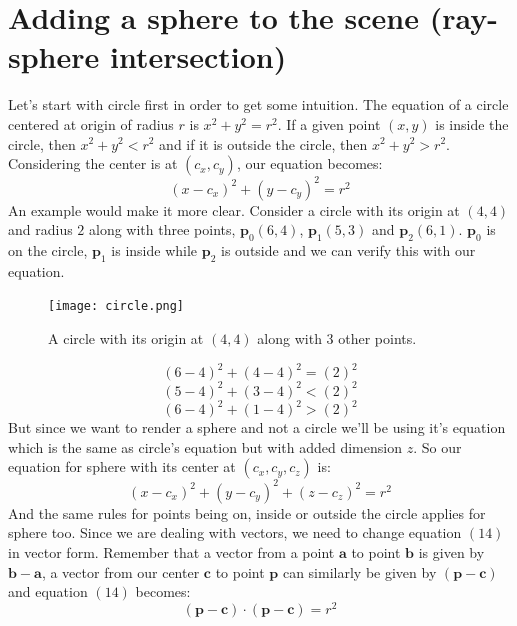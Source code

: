 \documentclass[11pt,a4paper]{article}
\begin{document}
	\section{Adding a sphere to the scene (ray-sphere intersection)}
	Let's start with circle first in order to get some intuition. The equation of a circle centered at origin of radius $r$ is $x^2+y^2=r^2$. If a given point $(x, y)$ is inside the circle, then $x^2+y^2<r^2$ and if it is outside the circle, then $x^2+y^2>r^2$. Considering the center is at $(c_{x}, c_{y})$, our equation becomes:
	\begin{equation}
		(x-c_{x})^2+(y-c_{y})^2=r^2
	\end{equation}
	An example would make it more clear. Consider a circle with its origin at $(4, 4)$ and radius $2$ along with three points, $\boldsymbol{p}_{0}(6, 4)$, $\boldsymbol{p}_{1}(5, 3)$ and $\boldsymbol{p}_{2}(6, 1)$. $\boldsymbol{p}_{0}$ is on the circle, $\boldsymbol{p}_{1}$ is inside while $\boldsymbol{p}_{2}$ is outside and we can verify this with our equation.
	\begin{figure}[H]
		\centering
		\texttt{[image: circle.png]}
		\caption{\centering A circle with its origin at $(4, 4)$ along with 3 other points.}
	\end{figure}
	\noindent
	\begin{equation}
		(6-4)^2+(4-4)^2=(2)^2
	\end{equation}
	\begin{equation}
		(5-4)^2+(3-4)^2<(2)^2
	\end{equation}
	\begin{equation}
		(6-4)^2+(1-4)^2>(2)^2
	\end{equation}
	But since we want to render a sphere and not a circle we'll be using it's equation which is the same as circle's equation but with added dimension $z$. So our equation for sphere with its center at $(c_{x}, c_{y}, c_{z})$ is:
	\begin{equation}
		(x-c_{x})^2+(y-c_{y})^2+(z-c_{z})^2=r^2
	\end{equation}
	And the same rules for points being on, inside or outside the circle applies for sphere too. Since we are dealing with vectors, we need to change equation $(14)$ in vector form. Remember that a vector from a point $\boldsymbol{a}$ to point $\boldsymbol{b}$ is given by $\boldsymbol{b}-\boldsymbol{a}$, a vector from our center $\boldsymbol{c}$ to point $\boldsymbol{p}$ can similarly be given by $(\boldsymbol{p}-\boldsymbol{c})$ and equation $(14)$ becomes:
	\begin{equation}
		(\boldsymbol{p}-\boldsymbol{c})\cdot(\boldsymbol{p}-\boldsymbol{c})=r^2
	\end{equation}
\end{document}
